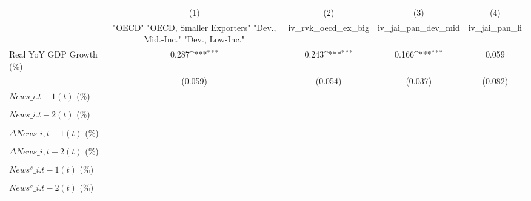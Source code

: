 {
\def\sym#1{\ifmmode^{#1}\else\(^{#1}\)\fi}
\begin{tabular}{l*{4}{c}}
\toprule
                    &\multicolumn{1}{c}{(1)}&\multicolumn{1}{c}{(2)}&\multicolumn{1}{c}{(3)}&\multicolumn{1}{c}{(4)}\\
                    &\multicolumn{1}{c}{ "OECD" "OECD, Smaller Exporters" "Dev., Mid.-Inc." "Dev., Low-Inc."}&\multicolumn{1}{c}{iv\_rvk\_oecd\_ex\_big}&\multicolumn{1}{c}{iv\_jai\_pan\_dev\_mid}&\multicolumn{1}{c}{iv\_jai\_pan\_li}\\
\midrule
Real YoY GDP Growth (\%)&       0.287\sym{***}&       0.243\sym{***}&       0.166\sym{***}&       0.059         \\
                    &     (0.059)         &     (0.054)         &     (0.037)         &     (0.082)         \\
\addlinespace
$ News\_{i.t-1}(t)$ (\%)&                     &                     &                     &                     \\
                    &                     &                     &                     &                     \\
\addlinespace
$ News\_{i.t-2}(t)$ (\%)&                     &                     &                     &                     \\
                    &                     &                     &                     &                     \\
\addlinespace
$ \Delta News\_{i,t-1}(t)$ (\%)&                     &                     &                     &                     \\
                    &                     &                     &                     &                     \\
\addlinespace
$ \Delta News\_{i,t-2}(t)$ (\%)&                     &                     &                     &                     \\
                    &                     &                     &                     &                     \\
\addlinespace
$ News^s\_{i.t-1}(t)$ (\%)&                     &                     &                     &                     \\
                    &                     &                     &                     &                     \\
\addlinespace
$ News^s\_{i.t-2}(t)$ (\%)&                     &                     &                     &                     \\

\end{tabular}}
